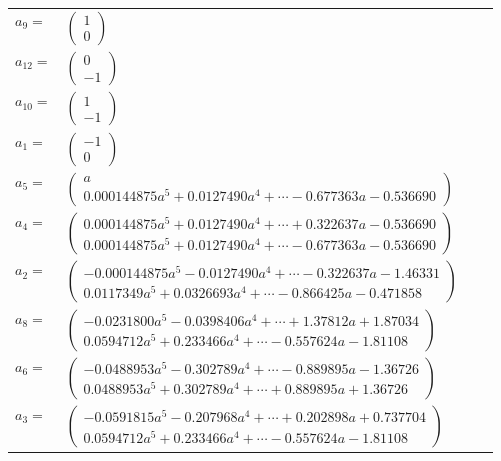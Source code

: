 \documentclass[1p]{elsarticle_modified}
\theoremstyle{definition}
\begin{document}
\begin{tabular}{m{7pt} m{180pt} m{7pt} m{180pt} }
\flushright $a_{9}=$&$\begin{pmatrix}1\\0\end{pmatrix}$ \\
\flushright $a_{12}=$&$\begin{pmatrix}0\\-1\end{pmatrix}$ \\
\flushright $a_{10}=$&$\begin{pmatrix}1\\-1\end{pmatrix}$ \\
\flushright $a_{1}=$&$\begin{pmatrix}-1\\0\end{pmatrix}$ \\
\flushright $a_{5}=$&$\begin{pmatrix}a\\0.000144875 a^{5}+0.0127490 a^{4}+\cdots-0.677363 a-0.536690\end{pmatrix}$ \\
\flushright $a_{4}=$&$\begin{pmatrix}0.000144875 a^{5}+0.0127490 a^{4}+\cdots+0.322637 a-0.536690\\0.000144875 a^{5}+0.0127490 a^{4}+\cdots-0.677363 a-0.536690\end{pmatrix}$ \\
\flushright $a_{2}=$&$\begin{pmatrix}-0.000144875 a^{5}-0.0127490 a^{4}+\cdots-0.322637 a-1.46331\\0.0117349 a^{5}+0.0326693 a^{4}+\cdots-0.866425 a-0.471858\end{pmatrix}$ \\
\flushright $a_{8}=$&$\begin{pmatrix}-0.0231800 a^{5}-0.0398406 a^{4}+\cdots+1.37812 a+1.87034\\0.0594712 a^{5}+0.233466 a^{4}+\cdots-0.557624 a-1.81108\end{pmatrix}$ \\
\flushright $a_{6}=$&$\begin{pmatrix}-0.0488953 a^{5}-0.302789 a^{4}+\cdots-0.889895 a-1.36726\\0.0488953 a^{5}+0.302789 a^{4}+\cdots+0.889895 a+1.36726\end{pmatrix}$ \\
\flushright $a_{3}=$&$\begin{pmatrix}-0.0591815 a^{5}-0.207968 a^{4}+\cdots+0.202898 a+0.737704\\0.0594712 a^{5}+0.233466 a^{4}+\cdots-0.557624 a-1.81108\end{pmatrix}$ \\

\end{tabular}
\end{document}
